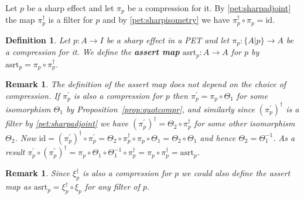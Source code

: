 \documentclass[a4paper,onecolumn,10pt,accepted=2019-05-03, issue=1, volume=1, shorttitle=papers/compositionality-1-1]{compositionalityarticle}
\newcounter{counter}
\numberwithin{counter}{section}
\newtheorem{definition}[counter]{Definition}
\newtheorem{remark}[counter]{Remark}
\newcommand{\asrt}{\text{asrt}}
\newcommand{\id}{\text{id}}
\begin{document}
Let $p$ be a sharp effect and let $\pi_p$ be a compression for it. By \ref{pet:sharpadjoint} the map $\pi_p^\dagger$ is a filter for $p$ and by \ref{pet:sharpisometry} we have $\pi_p^\dagger\circ \pi_p = \id$.

\begin{definition}
	Let $p:A\rightarrow I$ be a sharp effect in a PET and let $\pi_p: \{A\lvert p\}\rightarrow A$ be a compression for it. We define the \textbf{assert map} $\asrt_p:A\rightarrow A$ for $p$ by $\asrt_p = \pi_p\circ \pi_p^\dagger$. 
\end{definition}

\begin{remark}
    The definition of the assert map does not depend on the choice of compression. If $\pi_p^\prime$ is also a compression for $p$ then $\pi_p^\prime = \pi_p\circ\Theta_1$ for some isomorphism $\Theta_1$ by Proposition~\ref{prop:quotcompr}, and similarly since $(\pi_p^\prime)^\dagger$ is a filter by \ref{pet:sharpadjoint} we have $(\pi_p^\prime)^\dagger = \Theta_2\circ\pi_p^\dagger$ for some other isomorphism $\Theta_2$. Now $\id = (\pi_p^\prime)^\dagger\circ \pi_p^\prime = \Theta_2 \circ \pi_p^\dagger \circ \pi_p \circ \Theta_1 = \Theta_2\circ \Theta_1$ and hence $\Theta_2 = \Theta_1^{-1}$. As a result $\pi_p^\prime \circ (\pi_p^\prime)^\dagger = \pi_p\circ \Theta_1\circ \Theta_1^{-1} \circ \pi_p^\dagger = \pi_p \circ \pi_p^\dagger = \asrt_p$.
\end{remark}
\begin{remark}
    Since $\xi_p^\dagger$ is also a compression for $p$ we could also define the assert map as $\asrt_p = \xi_p^\dagger \circ \xi_p$ for any filter of $p$.
\end{remark}

\end{document}
